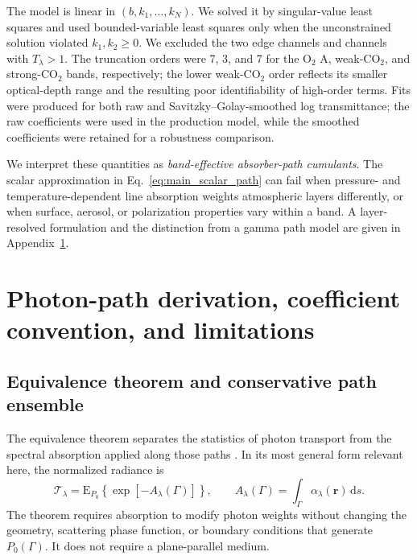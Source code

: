 The model is linear in $(b,k_1,\ldots,k_N)$.  We solved it by singular-value
least squares and used bounded-variable least squares only when the
unconstrained solution violated $k_1,k_2\geq0$.  We excluded the two edge
channels and channels with $T_\lambda>1$.  The truncation orders were 7, 3, and
7 for the O$_2$ A, weak-CO$_2$, and strong-CO$_2$ bands, respectively; the lower
weak-CO$_2$ order reflects its smaller optical-depth range and the resulting
poor identifiability of high-order terms.  Fits were produced for both raw and
Savitzky--Golay-smoothed log transmittance; the raw coefficients were used in
the production model, while the smoothed coefficients were retained for a
robustness comparison.

We interpret these quantities as \emph{band-effective absorber-path cumulants}.
The scalar approximation in Eq.~\eqref{eq:main_scalar_path} can fail when
pressure- and temperature-dependent line absorption weights atmospheric layers
differently, or when surface, aerosol, or polarization properties vary within a
band.  A layer-resolved formulation and the distinction from a gamma path model
are given in Appendix~\ref{app:photon_path_derivation}.



\section{Photon-path derivation, coefficient convention, and limitations}
\label{app:photon_path_derivation}

\subsection{Equivalence theorem and conservative path ensemble}
\label{app:equivalence}

The equivalence theorem separates the statistics of photon transport from the
spectral absorption applied along those paths \citep{irvine1964}.  In its most
general form relevant here, the normalized radiance is
\begin{equation}
  \mathcal T_\lambda
  = \mathrm{E}_{P_0}
    \left\{
      \exp[-A_\lambda(\Gamma)]
    \right\},
  \qquad
  A_\lambda(\Gamma)
  = \int_\Gamma \alpha_\lambda(\bm r)\,\mathrm{d}s.
  \label{eq:app_general_equivalence}
\end{equation}
The theorem requires absorption to modify photon weights without changing the
geometry, scattering phase function, or boundary conditions that generate
$P_0(\Gamma)$.  It does not require a plane-parallel medium.

